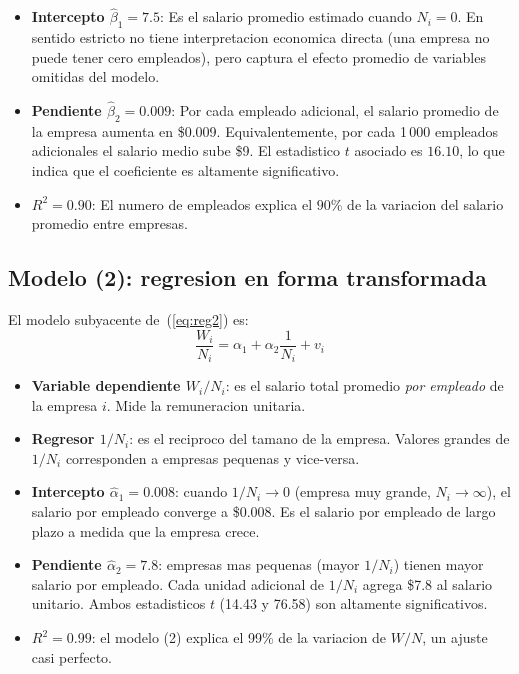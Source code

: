 \documentclass[12pt, letterpaper]{article}
\theoremstyle{remark}
\begin{document}
\begin{itemize}[leftmargin=1.6em, itemsep=5pt]
  \item \textbf{Intercepto $\hat\beta_1 = 7.5$}: Es el salario promedio estimado cuando
    $N_i = 0$. En sentido estricto no tiene interpretacion economica directa
    (una empresa no puede tener cero empleados), pero captura el efecto promedio de
    variables omitidas del modelo.

  \item \textbf{Pendiente $\hat\beta_2 = 0.009$}: Por cada empleado adicional, el
    salario promedio de la empresa aumenta en \$0.009. Equivalentemente, por cada
    1\,000 empleados adicionales el salario medio sube \$9. El estadistico $t$
    asociado es $16.10$, lo que indica que el coeficiente es altamente significativo.

  \item \textbf{$R^2 = 0.90$}: El numero de empleados explica el $90\%$ de la
    variacion del salario promedio entre empresas.
\end{itemize}

\subsection{Modelo (2): regresion en forma transformada}

El modelo subyacente de~(\ref{eq:reg2}) es:
\begin{equation}
  \frac{W_i}{N_i} = \alpha_1 + \alpha_2 \frac{1}{N_i} + v_i
  \label{eq:modelo2}
\end{equation}

\begin{itemize}[leftmargin=1.6em, itemsep=5pt]
  \item \textbf{Variable dependiente $W_i/N_i$}: es el salario total promedio
    \emph{por empleado} de la empresa $i$. Mide la remuneracion unitaria.

  \item \textbf{Regresor $1/N_i$}: es el reciproco del tamano de la empresa.
    Valores grandes de $1/N_i$ corresponden a empresas pequenas y vice-versa.

  \item \textbf{Intercepto $\hat\alpha_1 = 0.008$}: cuando $1/N_i \to 0$ (empresa
    muy grande, $N_i \to \infty$), el salario por empleado converge a \$0.008.
    Es el salario por empleado de largo plazo a medida que la empresa crece.

  \item \textbf{Pendiente $\hat\alpha_2 = 7.8$}: empresas mas pequenas (mayor
    $1/N_i$) tienen mayor salario por empleado. Cada unidad adicional de $1/N_i$
    agrega \$7.8 al salario unitario. Ambos estadisticos $t$ (14.43 y 76.58)
    son altamente significativos.

  \item \textbf{$R^2 = 0.99$}: el modelo (2) explica el 99\% de la variacion de
    $W/N$, un ajuste casi perfecto.
\end{itemize}
\end{document}
